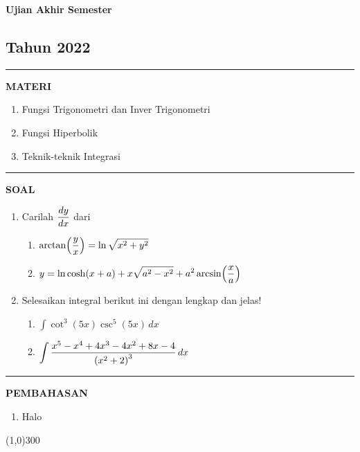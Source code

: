 \newpage
\begin{flushright}
    \textbf{\Large{Ujian Akhir Semester}}
    \subsection*{Tahun 2022}
\end{flushright}
\vspace{0.5cm}
\hrule height 2pt
\vspace{0.5cm}
\begin{center}
    \textbf{\large{MATERI}}
    \begin{enumerate}[leftmargin=*, label={\arabic*}.]
        \item Fungsi Trigonometri dan Inver Trigonometri
        \item Fungsi Hiperbolik
        \item Teknik-teknik Integrasi
    \end{enumerate}
\end{center}
\vspace{0.2cm}
\hrule height 1pt
\vspace{0.5cm}
\begin{center}
    \textbf{\large{SOAL}}
\end{center}
\begin{enumerate}[leftmargin=*, label={\arabic*}.]
\item Carilah $\ds \frac{dy}{dx}$ dari 
\begin{enumerate}[label={\alph*}.]
    \item $\ds \arctan\brk*{\frac{y}{x}}=\ln\sqrt{x^{2}+y^{2}}$
    \item $\ds y=\ln \cosh (x+a)+x\sqrt{a^{2}-x^{2}}+a^{2}\arcsin\brk*{\frac{x}{a}}$
\end{enumerate}
\item Selesaikan integral berikut ini dengan lengkap dan jelas!
\begin{enumerate}[label={\alph*}.]
    \item $\int \cot^{3}(5x)\csc^{5}(5x)\,dx$  
    \item $\ds \int \frac{x^{5}-x^{4}+4x^{3}-4x^{2}+8x-4}{\brk*{x^{2}+2}^{3}}\,dx$
\end{enumerate}
\end{enumerate}
\vspace{0.2cm}
\hrule height 1pt
\vspace{0.5cm}
\begin{center}
    \textbf{\large{PEMBAHASAN}}
\end{center}
\begin{enumerate}[leftmargin=*, label={\arabic*}.]
\item Halo
\end{enumerate}

\begin{center}
    \line(1,0){300}
\end{center}